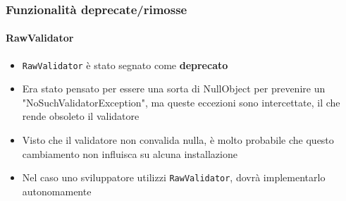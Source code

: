 \begin{frame}[fragile]
	\frametitle{Funzionalità deprecate/rimosse}
	\framesubtitle{RawValidator}

	\begin{itemize}
		\item \texttt{RawValidator} è stato segnato come \textbf{deprecato}
		\item Era stato pensato per essere una sorta di NullObject per prevenire un "NoSuchValidatorException",
			ma queste eccezioni sono intercettate, il che rende obsoleto il validatore
		\item Visto che il validatore non convalida nulla, è molto probabile
			che questo cambiamento non influisca su alcuna installazione
		\item Nel caso uno sviluppatore utilizzi \texttt{RawValidator}, dovrà implementarlo autonomamente
	\end{itemize}


\end{frame}

